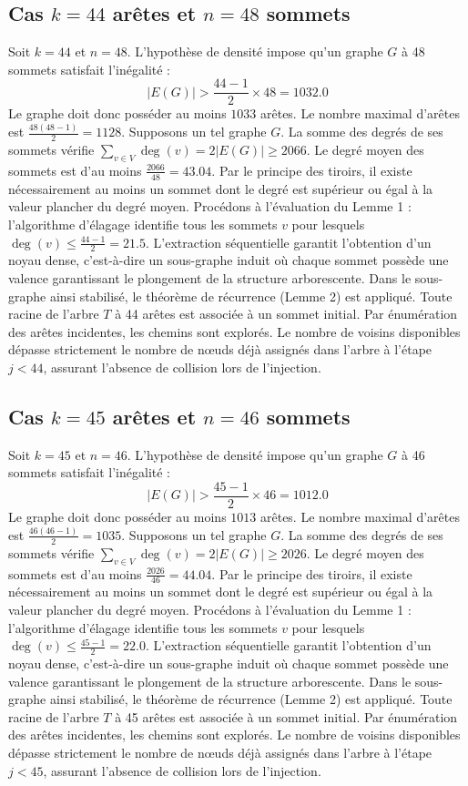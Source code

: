 \documentclass[12pt,a4paper]{article}
\begin{document}
\subsection{Cas $k = 44$ arêtes et $n = 48$ sommets}
Soit $k = 44$ et $n = 48$. L'hypothèse de densité impose qu'un graphe $G$ à 48 sommets satisfait l'inégalité :
$$ |E(G)| > \frac{44-1}{2} \times 48 = 1032.0 $$
Le graphe doit donc posséder au moins $1033$ arêtes. Le nombre maximal d'arêtes est $\frac{48(48-1)}{2} = 1128$.
Supposons un tel graphe $G$. La somme des degrés de ses sommets vérifie $\sum_{v \in V} \deg(v) = 2|E(G)| \geq 2066$.
Le degré moyen des sommets est d'au moins $\frac{2066}{48} = 43.04$.
Par le principe des tiroirs, il existe nécessairement au moins un sommet dont le degré est supérieur ou égal à la valeur plancher du degré moyen.
Procédons à l'évaluation du Lemme 1 : l'algorithme d'élagage identifie tous les sommets $v$ pour lesquels $\deg(v) \leq \frac{44-1}{2} = 21.5$.
L'extraction séquentielle garantit l'obtention d'un noyau dense, c'est-à-dire un sous-graphe induit où chaque sommet possède une valence garantissant le plongement de la structure arborescente.
Dans le sous-graphe ainsi stabilisé, le théorème de récurrence (Lemme 2) est appliqué. Toute racine de l'arbre $T$ à 44 arêtes est associée à un sommet initial. Par énumération des arêtes incidentes, les chemins sont explorés. Le nombre de voisins disponibles dépasse strictement le nombre de nœuds déjà assignés dans l'arbre à l'étape $j < 44$, assurant l'absence de collision lors de l'injection.

\subsection{Cas $k = 45$ arêtes et $n = 46$ sommets}
Soit $k = 45$ et $n = 46$. L'hypothèse de densité impose qu'un graphe $G$ à 46 sommets satisfait l'inégalité :
$$ |E(G)| > \frac{45-1}{2} \times 46 = 1012.0 $$
Le graphe doit donc posséder au moins $1013$ arêtes. Le nombre maximal d'arêtes est $\frac{46(46-1)}{2} = 1035$.
Supposons un tel graphe $G$. La somme des degrés de ses sommets vérifie $\sum_{v \in V} \deg(v) = 2|E(G)| \geq 2026$.
Le degré moyen des sommets est d'au moins $\frac{2026}{46} = 44.04$.
Par le principe des tiroirs, il existe nécessairement au moins un sommet dont le degré est supérieur ou égal à la valeur plancher du degré moyen.
Procédons à l'évaluation du Lemme 1 : l'algorithme d'élagage identifie tous les sommets $v$ pour lesquels $\deg(v) \leq \frac{45-1}{2} = 22.0$.
L'extraction séquentielle garantit l'obtention d'un noyau dense, c'est-à-dire un sous-graphe induit où chaque sommet possède une valence garantissant le plongement de la structure arborescente.
Dans le sous-graphe ainsi stabilisé, le théorème de récurrence (Lemme 2) est appliqué. Toute racine de l'arbre $T$ à 45 arêtes est associée à un sommet initial. Par énumération des arêtes incidentes, les chemins sont explorés. Le nombre de voisins disponibles dépasse strictement le nombre de nœuds déjà assignés dans l'arbre à l'étape $j < 45$, assurant l'absence de collision lors de l'injection.
\end{document}
